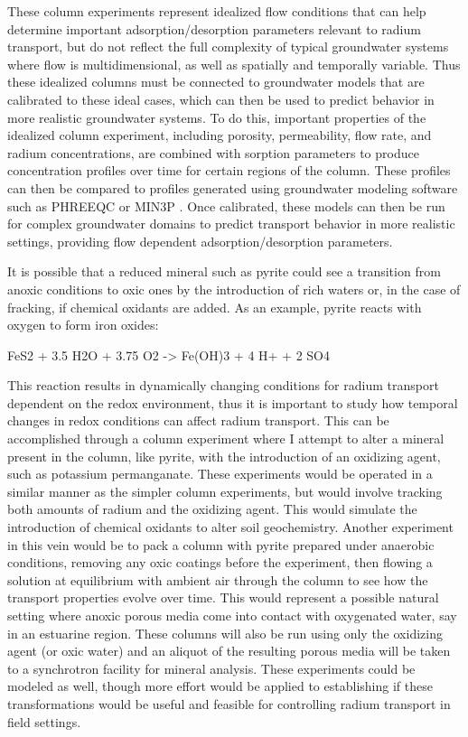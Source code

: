 \documentclass[twoside,12pt,titlepage]{article}
\begin{document}
\par These column experiments represent idealized flow conditions that can help determine important adsorption/desorption parameters relevant to radium transport, but do not reflect the full complexity of typical groundwater systems where flow is multidimensional, as well as spatially and temporally variable. Thus these idealized columns must be connected to groundwater models that are calibrated to these ideal cases, which can then be used to predict behavior in more realistic groundwater systems. To do this, important properties of the idealized column experiment, including porosity, permeability, flow rate, and radium concentrations, are combined with sorption parameters to produce concentration profiles over time for certain regions of the column. These profiles can then be compared to profiles generated using groundwater modeling software such as PHREEQC \cite{PHREEQC} or MIN3P \cite{MIN3P}. Once calibrated, these models can then be run for complex groundwater domains to predict transport behavior in more realistic settings, providing flow dependent adsorption/desorption parameters.
\par It is possible that a reduced mineral such as pyrite could see a transition from anoxic conditions to oxic ones by the introduction of  rich waters or, in the case of fracking, if chemical oxidants are added. As an example, pyrite reacts with oxygen to form iron oxides:

\begin{reaction*}
FeS2{\sld} + 3.5 H2O{\lqd} + 3.75 O2{\gas} -> Fe(OH)3{\sld} + 4 H+ + 2 SO4\mch[2]
\end{reaction*}

This reaction results in dynamically changing conditions for radium transport dependent on the redox environment, thus it is important to study how temporal changes in redox conditions can affect radium transport. This can be accomplished through a column experiment where I attempt to alter a mineral present in the column, like pyrite, with the introduction of an oxidizing agent, such as potassium permanganate. These experiments would be operated in a similar manner as the simpler column experiments, but would involve tracking both amounts of radium and the oxidizing agent. This would simulate the introduction of chemical oxidants to alter soil geochemistry. Another experiment in this vein would be to pack a column with pyrite prepared under anaerobic conditions, removing any oxic coatings before the experiment, then flowing a solution at equilibrium with ambient air through the column to see how the transport properties evolve over time. This would represent a possible natural setting where anoxic porous media come into contact with oxygenated water, say in an estuarine region. These columns will also be run using only the oxidizing agent (or oxic water) and an aliquot of the resulting porous media will be taken to a synchrotron facility for mineral analysis. These experiments could be modeled as well, though more effort would be applied to establishing if these transformations would be useful and feasible for controlling radium transport in field settings.
\end{document}
